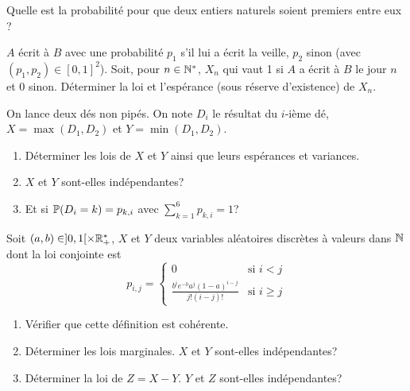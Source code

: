 \begin{exercise}
	Quelle est la probabilité pour que deux entiers naturels soient premiers entre
	eux ?
\end{exercise}

\begin{exercise}
	$A$ écrit à $B$ avec une probabilité $p_{1}$ s'il lui a écrit la veille,
	$p_{2}$ sinon (avec $(p_{1},p_{2})\in[0,1]^{2}$). Soit, pour $n\in\N^{*}$,
	$X_{n}$ qui vaut 1 si $A$ a écrit à $B$ le jour $n$ et 0 sinon. Déterminer la
	loi et l'espérance (sous réserve d'existence) de $X_{n}$.
\end{exercise}

\begin{exercise}
	On lance deux dés non pipés. On note $D_{i}$ le résultat du $i$-ième dé,
	$X=\max(D_{1},D_{2})$ et $Y=\min(D_{1},D_{2})$.
	\begin{enumerate}
		\item
		Déterminer les lois de $X$ et $Y$ ainsi que leurs espérances et variances.
		\item
		$X$ et $Y$ sont-elles indépendantes?
		\item
		Et si $\P(D_{i}=k)=p_{k,i}$ avec $\sum_{k=1}^{6}p_{k,i}=1$?
	\end{enumerate}
\end{exercise}

\begin{exercise}
	Soit $(a,b)\in]0,1[\times\R_{+}^{*}$, $X$ et $Y$ deux variables aléatoires
	discrètes à valeurs dans $\N$ dont la loi conjointe est
	$$
	p_{i,j}=
	\left\{
		\begin{array}{cc}
			0 & \text{si }i<j\\
			\frac{b^{i}e^{-b}a^{j}(1-a)^{i-j}}{j!(i-j)!} & \text{si }i\geqslant j
		\end{array}
	\right.
	$$
	\begin{enumerate}
		\item
		Vérifier que cette définition est cohérente.
		\item
		Déterminer les lois marginales. $X$ et $Y$ sont-elles indépendantes?
		\item
		Déterminer la loi de $Z=X-Y$. $Y$ et $Z$ sont-elles indépendantes?
	\end{enumerate}
\end{exercise}

